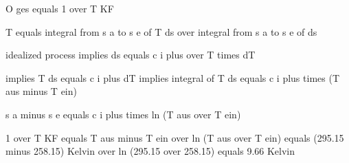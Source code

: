 O ges equals 1 over T KF

T equals integral from s a to s e of T ds over integral from s a to s e of ds

idealized process implies ds equals c i plus over T times dT

implies T ds equals c i plus dT implies integral of T ds equals c i plus times (T aus minus T ein)

s a minus s e equals c i plus times ln (T aus over T ein)

1 over T KF equals T aus minus T ein over ln (T aus over T ein) equals (295.15 minus 258.15) Kelvin over ln (295.15 over 258.15) equals 9.66 Kelvin